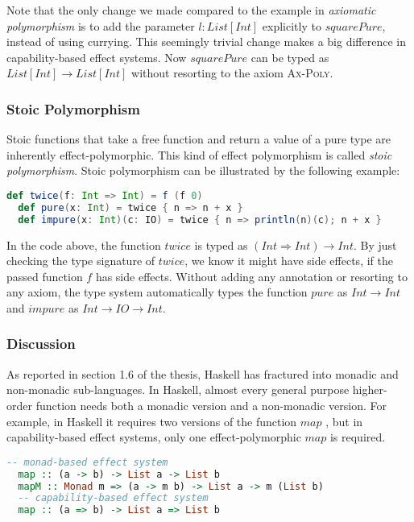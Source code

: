 Note that the only change we made compared to the example in
\emph{axiomatic polymorphism} is to add the parameter $l: List[Int]$
explicitly to $squarePure$, instead of using currying. This seemingly
trivial change makes a big difference in capability-based effect
systems. Now $squarePure$ can be typed as $List[Int] \to List[Int]$
without resorting to the axiom \textsc{Ax-Poly}.

\subsubsection{Stoic Polymorphism}

Stoic functions that take a free function and return a value of a pure
type are inherently effect-polymorphic. This kind of effect
polymorphism is called \emph{stoic polymorphism}.  Stoic polymorphism
can be illustrated by the following example:

\begin{lstlisting}[language=Scala]
  def twice(f: Int => Int) = f (f 0)
  def pure(x: Int) = twice { n => n + x }
  def impure(x: Int)(c: IO) = twice { n => println(n)(c); n + x }
\end{lstlisting}

In the code above, the function $twice$ is typed as
$(Int \Rightarrow Int) \to Int$. By just checking the type signature
of $twice$, we know it might have side effects, if the passed function
$f$ has side effects. Without adding any annotation or resorting to
any axiom, the type system automatically types the function $pure$ as
$Int \to Int$ and $impure$ as $Int \to IO \to Int$.

\subsubsection{Discussion}

As reported in section 1.6 of the thesis\cite{lippmeier2009type},
Haskell has fractured into monadic and non-monadic sub-languages. In
Haskell, almost every general purpose higher-order function needs both
a monadic version and a non-monadic version. For example, in Haskell
it requires two versions of the function $map$ , but in
capability-based effect systems, only one effect-polymorphic $map$ is
required.

\begin{lstlisting}[language=Haskell]
  -- monad-based effect system
  map :: (a -> b) -> List a -> List b
  mapM :: Monad m => (a -> m b) -> List a -> m (List b)
  -- capability-based effect system
  map :: (a => b) -> List a => List b
\end{lstlisting}

